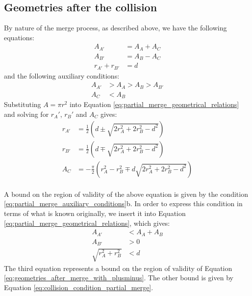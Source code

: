 \documentclass{article}
\begin{document}
\subsection{Geometries after the collision}
By nature of the merge process, as described above, we have the following equations:
\begin{equation}
\label{eq:partial_merge_geometrical_relations}
\begin{split}
A_{A'} &= A_A + A_C\\
A_{B'} &= A_B - A_C\\
r_{A'} + r_{B'} &= d
\end{split}
\end{equation}
%
and the following auxiliary conditions:
%
\begin{equation}
\label{eq:partial_merge_auxiliary_conditions}
\begin{split}
A_{A'} &> A_A > A_B > A_{B'}\\
A_C &< A_B
\end{split}
\end{equation}
Substituting $A = \pi r^2$ into Equation \ref{eq:partial_merge_geometrical_relations} and solving for $r_A'$, $r_B'$ and $A_C$ gives:
\begin{equation}
\label{eq:geometries_after_merge_with_plusminus}
\begin{split}
r_{A'} &= \frac{1}{2}\left(d \pm \sqrt{2r_A^2 + 2r_B^2 - d^2}\right)\\
r_{B'} &= \frac{1}{2}\left(d \mp \sqrt{2r_A^2 + 2r_B^2 - d^2}\right)\\
A_C &= -\frac{\pi}{2}\left(r_A^2 - r_B^2 \mp d\sqrt{2r_A^2 + 2r_B^2 - d^2}\right)\\
\end{split}
\end{equation}

A bound on the region of validity of the above equation is given by the condition \ref{eq:partial_merge_auxiliary_conditions}b. In order to express this condition in terms of what is known originally, we insert it into Equation \ref{eq:partial_merge_geometrical_relations}, which gives:
\begin{equation}
\label{eq:region_of_validity}
\begin{split}
A_{A'} &< A_A + A_B\\
A_{B'} &> 0\\
\sqrt{r_A^2 + r_B^2} &< d
\end{split}
\end{equation}
The third equation represents a bound on the region of validity of Equation \ref{eq:geometries_after_merge_with_plusminus}. The other bound is given by Equation \ref{eq:collision_condition_partial_merge}.
\end{document}
